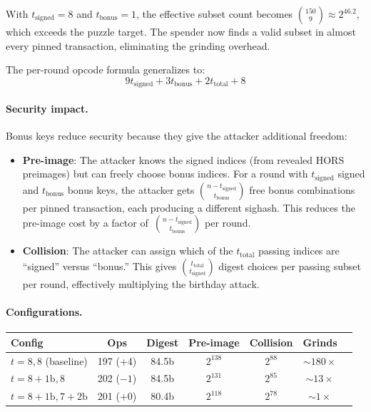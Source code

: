 \documentclass[11pt, a4paper]{article}
\begin{document}
\noindent With $t_{\mathrm{signed}} = 8$ and $t_{\mathrm{bonus}} = 1$, the effective subset count becomes $\binom{150}{9} \approx 2^{46.2}$, which exceeds the puzzle target. The spender now finds a valid subset in almost every pinned transaction, eliminating the grinding overhead.

The per-round opcode formula generalizes to:
$$9 t_{\mathrm{signed}} + 3 t_{\mathrm{bonus}} + 2 t_{\mathrm{total}} + 8$$

\paragraph{Security impact.}
Bonus keys reduce security because they give the attacker additional freedom:

\begin{itemize}
    \item \textbf{Pre-image}: The attacker knows the signed indices (from revealed HORS preimages) but can freely choose bonus indices. For a round with $t_{\mathrm{signed}}$ signed and $t_{\mathrm{bonus}}$ bonus keys, the attacker gets $\binom{n - t_{\mathrm{signed}}}{t_{\mathrm{bonus}}}$ free bonus combinations per pinned transaction, each producing a different sighash. This reduces the pre-image cost by a factor of~$\binom{n - t_{\mathrm{signed}}}{t_{\mathrm{bonus}}}$ per round.

    \item \textbf{Collision}: The attacker can assign which of the $t_{\mathrm{total}}$ passing indices are ``signed'' versus ``bonus.'' This gives $\binom{t_{\mathrm{total}}}{t_{\mathrm{signed}}}$ digest choices per passing subset per round, effectively multiplying the birthday attack.
\end{itemize}

\paragraph{Configurations.}

\begin{center}
\small
\begin{tabular}{lcccccc}
\toprule
\textbf{Config} & \textbf{Ops} & \textbf{Digest} & \textbf{Pre-image} & \textbf{Collision} & \textbf{Grinds} \\
\midrule
$t{=}8, 8$ (baseline) & 197 (+4) & 84.5b & $2^{138}$ & $2^{88}$ & ${\sim}180\times$ \\
$t{=}8{+}1\mathrm{b}, 8$ & 202 ($-1$) & 84.5b & $2^{131}$ & $2^{85}$ & ${\sim}13\times$ \\
$t{=}8{+}1\mathrm{b}, 7{+}2\mathrm{b}$ & 201 (+0) & 80.4b & $2^{118}$ & $2^{78}$ & ${\sim}1\times$ \\
\bottomrule
\end{tabular}
\end{center}
\end{document}
